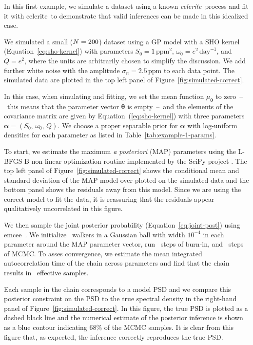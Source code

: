 \documentclass[manuscript, letterpaper]{aastex6}
\newcommand{\project}[1]{\textsf{#1}}
\newcommand{\celerite}{\project{celerite}}
\newcommand{\celeriteterm}{\emph{celerite}}
\newcommand{\emcee}{\project{emcee}}
\newcommand{\figureref}[1]{\ref{fig:#1}}
\newcommand{\Figure}[1]{Figure~\figureref{#1}}
\renewcommand{\eqref}[1]{\ref{eq:#1}}
\newcommand{\Eq}[1]{Equation~(\eqref{#1})}
\newcommand{\eq}[1]{\Eq{#1}}
\newcommand{\eqalt}[1]{Equation~\eqref{#1}}
\newcommand{\bvec}[1]{{\ensuremath{\boldsymbol{#1}}}}
\newcommand{\response}[1]{{\color{blue}#1}}
\begin{document}
In this first example, we simulate a dataset using a known \celeriteterm\
process and fit it with \celerite\ to demonstrate that valid inferences can be
made in this idealized case.
\response{We simulated a small ($N = 200$) dataset using a GP model
with a SHO kernel (\eqalt{sho-kernel}) with parameters $S_0 =
1\,\mathrm{ppm}^2$, $\omega_0 = e^2\,\mathrm{day}^{-1}$, and $Q = e^2$, where
the units are arbitrarily chosen to simplify the discussion.
We add further white noise with the amplitude $\sigma_n = 2.5\, \mathrm{ppm}$
to each data point.
The simulated data are plotted in the top left panel of
\Figure{simulated-correct}.

In this case, when simulating and fitting, we set the mean function
$\mu_\bvec{\theta}$ to zero~--~this means that the parameter vector
$\bvec{\theta}$ is empty~--~and the elements of the covariance matrix are
given by \eq{sho-kernel} with three parameters $\bvec{\alpha} = (S_0,\,
\omega_0,\,Q)$.
We choose a proper separable prior for $\bvec{\alpha}$ with log-uniform
densities for each parameter as listed in Table~\ref{tab:example-1-params}.

To start, we estimate the maximum \emph{a posteriori} (MAP) parameters using
the \project{L-BFGS-B} non-linear optimization routine \citep{Byrd:1995,
Zhu:1997} implemented by the \project{SciPy} project \citep{Jones:2001}.
The top left panel of \Figure{simulated-correct} shows the conditional mean
and standard deviation of the MAP model over-plotted on the simulated data and
the bottom panel shows the residuals away from this model.
Since we are using the correct model to fit the data, it is reassuring that
the residuals appear qualitatively uncorrelated in this figure.

We then sample the joint posterior probability (\eqalt{joint-post}) using
\emcee\ \citep{Goodman:2010, Foreman-Mackey:2013}.
We initialize \exampleinwalkers~walkers in a Gaussian ball with width
$10^{-4}$ in each parameter around the MAP parameter vector, run
\exampleinburn~steps of burn-in, and \exampleinsteps~steps of MCMC.
To asses convergence, we estimate the mean integrated autocorrelation time of
the chain across parameters \citep{Sokal:1989, Goodman:2010} and find that the
chain results in \exampleineff~effective samples.

Each sample in the chain corresponds to a model PSD and we compare this
posterior constraint on the PSD to the true spectral density in the
right-hand panel of \Figure{simulated-correct}.
In this figure, the true PSD is plotted as a dashed black line and the
numerical estimate of the posterior inference is shown as a blue contour
indicating 68\% of the MCMC samples.
It is clear from this figure that, as expected, the inference correctly
reproduces the true PSD.
}
\end{document}
